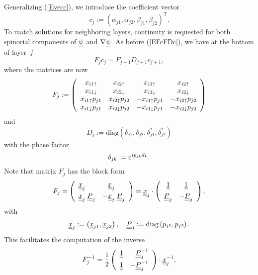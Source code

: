 Generalizing (\ref{Evecc}),
we introduce the coefficient vector
\begin{equation}
  c_j := {(\alpha_{j1}, \alpha_{j2}, \beta_{j1}, \beta_{j2})}^\text{T}.
\end{equation}
To match solutions for neighboring layers,
continuity is requested for both spinorial components
of $\underline{\psi}$ and $\mathbf{\nabla}\underline{\psi}$.
As before (\ref{EFcFDc}), we have at the bottom of layer~$j$
\begin{equation}\label{EFcFDcp}
  F_j c_j = F_{j+1} D_{j+1} c_{j+1},
\end{equation}
where the matrices are now
\begin{equation}
  F_j := \left(\begin{array}{cccc}
    x_{i1\uparrow}      &x_{i2\uparrow}     &x_{i1\uparrow}       &x_{i2\uparrow}       \\
    x_{i1\downarrow}      &x_{i2\downarrow}     &x_{i1\downarrow}       &x_{i2\downarrow}       \\
    x_{i1\uparrow}p_{j1}&x_{i2\uparrow}p_{j2}&-x_{i1\uparrow}p_{j1}&-x_{i2\uparrow}p_{j2}\\
    x_{i1\downarrow}p_{j1}&x_{i2\downarrow}p_{j2}&-x_{i1\downarrow}p_{j1}&-x_{i2\downarrow}p_{j2}
  \end{array}\right)
\end{equation}
and
\begin{equation}
  D_j := \text{diag}(\delta_{j1}, \delta_{j2}, \delta_{j1}^*, \delta_{j2}^*)
\end{equation}
with the phase factor
\begin{equation}
   \delta_{jk} := \text{e}^{ip_{jk}d_k}.
\end{equation}
Note that matrix $F_j$ has the block form
\begin{equation}
  F_j
  =\left(\begin{array}{ll}\underline{\underline{x}}_j&\hphantom{-}\underline{\underline{x}}_j\\[1ex]
    \underline{\underline{x}}_j\; \underline{\underline{P}}_j&-\underline{\underline{x}}_j\; \underline{\underline{P}}_j\end{array}\right)
    = \underline{\underline{x}}_j \cdot
    \left(\begin{array}{cc}\underline{\underline{1}}&\underline{\underline{1}}\\[1ex]
    \underline{\underline{P}}_j&-\underline{\underline{P}}_j\end{array}\right),
\end{equation}
with
\begin{equation}
  \underline{\underline{x}}_j :=
  \left(\underline{x}_{j1}, \underline{x}_{j2}\right),
  \quad
  \underline{\underline{P}}_j :=
  \text{diag}\left(p_{j1},p_{j2}\right).
\end{equation}
This facilitates the computation of the inverse
\begin{equation}
  F_j^{-1}
    = \frac{1}{2}
    \left(\begin{array}{cc}\underline{\underline{1}}&\hphantom{-}\underline{\underline{P}}_j^{-1}\\[1.2ex]
      \underline{\underline{1}} &-\underline{\underline{P}}_j^{-1}\end{array}\right)
      \cdot\underline{\underline{x}}_j^{-1},
\end{equation}
